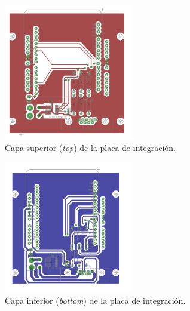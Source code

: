 \begin{figure}[ht]
  \centering
  \includegraphics[width=0.5\textwidth]{img/anexo/top_layer}
  \caption{Capa superior (\textit{top}) de la placa de integración.}
  \label{anexo_pcb_top}
\end{figure}


\begin{figure}[ht]
  \centering
  \includegraphics[width=0.5\textwidth]{img/anexo/bottom_layer}
  \caption{Capa inferior (\textit{bottom}) de la placa de integración.}
  \label{anexo_pcb_bottom}
\end{figure}

